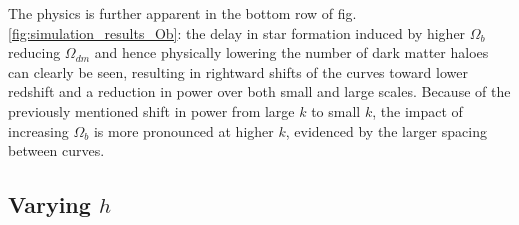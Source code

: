 \documentclass[floats,floatfix,showpacs,amssymb,prd,superscriptaddress,nofootinbib]{revtex4-2} %
\begin{document}
The physics is further apparent in the bottom row of fig. \ref{fig:simulation_results_Ob}: the delay in star formation induced by higher $\Omega_b$ reducing $\Omega_{dm}$ and hence physically lowering the number of dark matter haloes can clearly be seen, resulting in rightward shifts of the curves toward lower redshift and a reduction in power over both small and large scales. Because of the previously mentioned shift in power from large $k$ to small $k$, the impact of increasing $\Omega_b$ is more pronounced at higher $k$, evidenced by the larger spacing between curves.



\subsection{Varying $h$}
\end{document}
